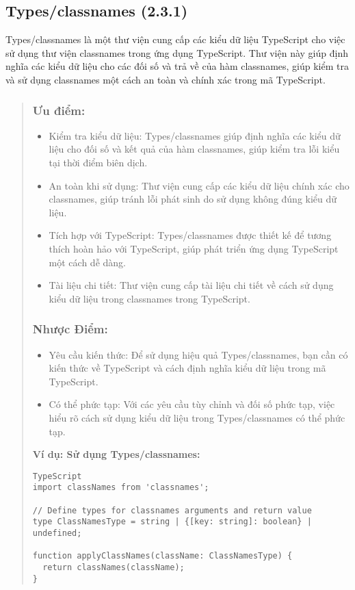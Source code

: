 


\subsection{Types/classnames (2.3.1)}

Types/classnames là một thư viện cung cấp các kiểu dữ liệu TypeScript cho việc sử dụng thư viện classnames trong ứng dụng TypeScript. Thư viện này giúp định nghĩa các kiểu dữ liệu cho các đối số và trả về của hàm classnames, giúp kiểm tra và sử dụng classnames một cách an toàn và chính xác trong mã TypeScript.

\begin{quote}
\subsubsection{Ưu điểm:}
\begin{itemize}
  \item Kiểm tra kiểu dữ liệu: Types/classnames giúp định nghĩa các kiểu dữ liệu cho đối số và kết quả của hàm classnames, giúp kiểm tra lỗi kiểu tại thời điểm biên dịch.
  \item An toàn khi sử dụng: Thư viện cung cấp các kiểu dữ liệu chính xác cho classnames, giúp tránh lỗi phát sinh do sử dụng không đúng kiểu dữ liệu.
  \item Tích hợp với TypeScript: Types/classnames được thiết kế để tương thích hoàn hảo với TypeScript, giúp phát triển ứng dụng TypeScript một cách dễ dàng.
  \item Tài liệu chi tiết: Thư viện cung cấp tài liệu chi tiết về cách sử dụng kiểu dữ liệu trong classnames trong TypeScript.
\end{itemize}

\subsubsection{Nhược Điểm:}
\begin{itemize}
  \item Yêu cầu kiến thức: Để sử dụng hiệu quả Types/classnames, bạn cần có kiến thức về TypeScript và cách định nghĩa kiểu dữ liệu trong mã TypeScript.
  \item Có thể phức tạp: Với các yêu cầu tùy chỉnh và đối số phức tạp, việc hiểu rõ cách sử dụng kiểu dữ liệu trong Types/classnames có thể phức tạp.
\end{itemize}

\textbf{Ví dụ: Sử dụng Types/classnames:}
\begin{lstlisting}
TypeScript
import classNames from 'classnames';

// Define types for classnames arguments and return value
type ClassNamesType = string | {[key: string]: boolean} | undefined;

function applyClassNames(className: ClassNamesType) {
  return classNames(className);
}
\end{lstlisting}
\end{quote}




